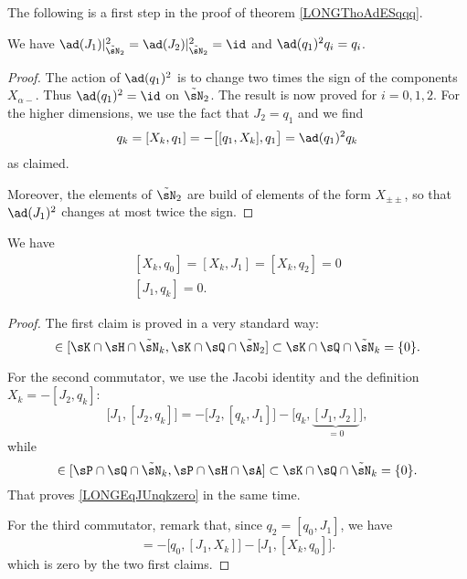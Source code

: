 The following is a first step in the proof of theorem \ref{LONGThoAdESqqq}.
\begin{corollary}			\label{LONGCorAdQUncarreqi}
	We have $\ad(J_1)|_{\tilde\sN_2}^2=\ad(J_2)|_{\tilde\sN_2}^2=\id$ and $\ad(q_1)^2q_i=q_i$.
\end{corollary}

\begin{proof}
	The action of $\ad(q_1)^2$ is to change two times the sign of the components $X_{\alpha -}$. Thus $\ad(q_1)^2=\id$ on $\tilde\sN_2$. The result is now proved for $i=0,1,2$. For the higher dimensions, we use the fact that $J_2=q_1$ and we find
	\begin{equation}
		q_k=[X_k,q_1]=-\big[ [q_1,X_k],q_1 \big]=\ad(q_1)^2q_k
	\end{equation}
	as claimed.

	Moreover, the elements of $\tilde\sN_2$ are build of elements of the form $X_{\pm\pm}$, so that $\ad(J_1)^2$ changes at most twice the sign.

\end{proof}

\begin{lemma}		\label{LONGLemXkqzerozero}\label{LONGLemXkJunzero}
	We have
	\begin{subequations}
		\begin{align}
			[X_k,q_0]=[X_k,J_1]=[X_k,q_2]=0\\
			[J_1,q_k]=0.		\label{LONGEqJUnqkzero}
		\end{align}
	\end{subequations}
\end{lemma}

\begin{proof}
	The first claim is proved in a very standard way:
	\begin{equation}
		[X_k,q_0]\in[\sK\cap\sH\cap\tilde\sN_k,\sK\cap\sQ\cap\tilde\sN_2]\subset\sK\cap\sQ\cap\tilde\sN_k=\{ 0 \}.
	\end{equation}

	For the second commutator, we use the Jacobi identity and the definition $X_k=-[J_2,q_k]$:
	\begin{equation}		\label{LONGEqJ1J2qkzero}
		\big[ J_1,[J_2,q_k] \big]=-\big[ J_2,[q_k,J_1] \big]-\big[ q_k,\underbrace{[J_1,J_2]}_{=0} \big],
	\end{equation}
	while
	\begin{equation}
		[q_k,J_1]\in[\sP\cap\sQ\cap\tilde\sN_k,\sP\cap\sH\cap\sA]\subset\sK\cap\sQ\cap\tilde\sN_k=\{ 0 \}.
	\end{equation}
	That proves \eqref{LONGEqJUnqkzero} in the same time.

	For the third commutator, remark that, since $q_2=[q_0,J_1]$, we have
	\begin{equation}
		[X_k,q_2]=-\big[ q_0,[J_1,X_k] \big]-\big[ J_1,[X_k,q_0] \big].
	\end{equation}
	which is zero by the two first claims.
\end{proof}

